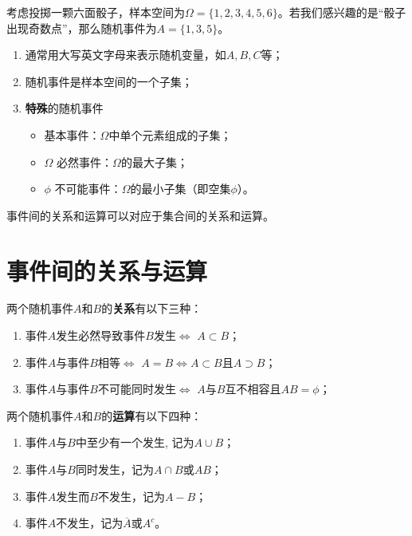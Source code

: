 \begin{example}
考虑投掷一颗六面骰子，样本空间为$\Omega = \{1,2,3,4,5,6\}$。若我们感兴趣的是“骰子出现奇数点”，那么随机事件为$A=\{1,3,5\}$。
\end{example}
\begin{remark}
    \begin{enumerate}
\item 通常用大写英文字母来表示随机变量，如$A,B,C$等；
\item 随机事件是样本空间的一个子集；
\item {\bf 特殊}的随机事件
\begin{itemize}
\item 基本事件：$\Omega$中单个元素组成的子集；
\item $ \Omega$ 必然事件：$\Omega$的最大子集；
\item $ \phi$ 不可能事件：$\Omega$的最小子集（即空集$\phi$）。
\end{itemize}
\end{enumerate}
\end{remark}


事件间的关系和运算可以对应于集合间的关系和运算。

\section{事件间的关系与运算}

两个随机事件$A$和$B$的{\bf 关系}有以下三种：
\begin{enumerate}
    \item 事件$A$发生必然导致事件$B$发生$\Longleftrightarrow$ $ A\subset B$；
    \item  事件$A$与事件$B$相等$\Longleftrightarrow$ $A=B$$\Longleftrightarrow A\subset B$且$ A\supset B$；
    \item 事件$A$与事件$B$不可能同时发生$\Longleftrightarrow$ $A$与$B$互不相容且$AB=\phi$；
\end{enumerate}
\begin{note}
    \vspace{3cm}
\end{note}

两个随机事件$A$和$B$的{\bf 运算}有以下四种：
\begin{enumerate}
    \item 事件$A$与$B$中至少有一个发生, 记为$A\cup B$；
    \item 事件$A$与$B$同时发生，记为$A\cap B$或$AB$；
    \item  事件$A$发生而$B$不发生，记为$A-B$；
   \item 事件$A$不发生，记为$\overline{A}$或$A^{c}$。
\end{enumerate}
\begin{note}
    \vspace{3cm}
\end{note}

